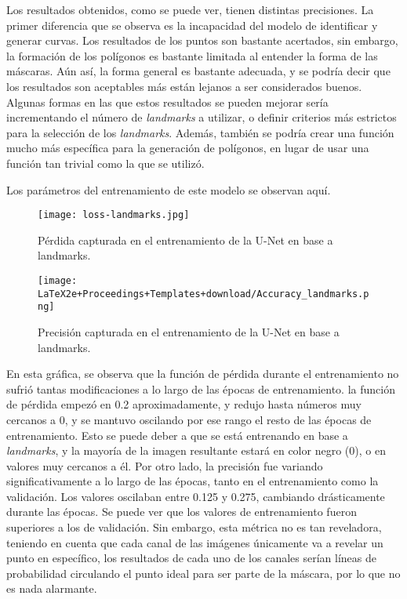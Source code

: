 \documentclass[runningheads]{llncs}
\begin{document}
Los resultados obtenidos, como se puede ver, tienen distintas precisiones. La primer diferencia que se observa es la incapacidad del modelo de identificar y generar curvas. Los resultados de los puntos son bastante acertados, sin embargo, la formación de los polígonos es bastante limitada al entender la forma de las máscaras. Aún así, la forma general es bastante adecuada, y se podría decir que los resultados son aceptables más están lejanos a ser considerados buenos. Algunas formas en las que estos resultados se pueden mejorar sería incrementando el número de \textit{landmarks} a utilizar, o definir criterios más estrictos para la selección de los \textit{landmarks}. Además, también se podría crear una función mucho más específica para la generación de polígonos, en lugar de usar una función tan trivial como la que se utilizó.

Los parámetros del entrenamiento de este modelo se observan aquí.

\begin{figure}[H]
    \centering
    \texttt{[image: loss-landmarks.jpg]}
    \caption{Pérdida capturada en el entrenamiento de la U-Net en base a landmarks.}
\end{figure}

\begin{figure}[H]
    \centering
    \texttt{[image: LaTeX2e+Proceedings+Templates+download/Accuracy\_landmarks.png]}
    \caption{Precisión capturada en el entrenamiento de la U-Net en base a landmarks.}
\end{figure}

En esta gráfica, se observa que la función de pérdida durante el entrenamiento no sufrió tantas modificaciones a lo largo de las épocas de entrenamiento. la función de pérdida empezó en 0.2 aproximadamente, y redujo hasta números muy cercanos a 0, y se mantuvo oscilando por ese rango el resto de las épocas de entrenamiento. Esto se puede deber a que se está entrenando en base a \textit{landmarks}, y la mayoría de la imagen resultante estará en color negro (0), o en valores muy cercanos a él. Por otro lado, la precisión fue variando significativamente a lo largo de las épocas, tanto en el entrenamiento como la validación. Los valores oscilaban entre 0.125 y 0.275, cambiando drásticamente durante las épocas. Se puede ver que los valores de entrenamiento fueron superiores a los de validación. Sin embargo, esta métrica no es tan reveladora, teniendo en cuenta que cada canal de las imágenes únicamente va a revelar un punto en específico, los resultados de cada uno de los canales serían líneas de probabilidad circulando el punto ideal para ser parte de la máscara, por lo que no es nada alarmante. 
\end{document}
